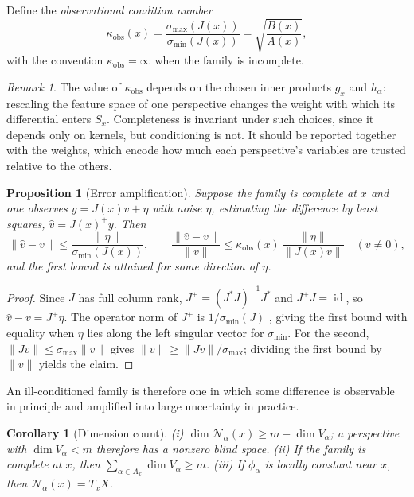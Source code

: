 \documentclass[11pt]{article}
\newtheorem{proposition}{Proposition}
\newtheorem{corollary}{Corollary}
\theoremstyle{remark}
\newtheorem{remark}{Remark}
\newcommand{\N}{\mathcal{N}}
\newcommand{\id}{\operatorname{id}}
\begin{document}
Define the \emph{observational condition number}
\[
\kappa_{\mathrm{obs}}(x)=\frac{\sigma_{\max}(J(x))}{\sigma_{\min}(J(x))}=\sqrt{\frac{B(x)}{A(x)}},
\]
with the convention $\kappa_{\mathrm{obs}}=\infty$ when the family is incomplete.

\begin{remark}
The value of $\kappa_{\mathrm{obs}}$ depends on the chosen inner products $g_x$ and $h_\alpha$: rescaling the feature space of one perspective changes the weight with which its differential enters $S_x$. Completeness is invariant under such choices, since it depends only on kernels, but conditioning is not. It should be reported together with the weights, which encode how much each perspective's variables are trusted relative to the others.
\end{remark}

\begin{proposition}[Error amplification]
Suppose the family is complete at $x$ and one observes $y=J(x)v+\eta$ with noise $\eta$, estimating the difference by least squares, $\hat v=J(x)^{+}y$. Then
\[
\|\hat v-v\|\le\frac{\|\eta\|}{\sigma_{\min}(J(x))},
\qquad
\frac{\|\hat v-v\|}{\|v\|}\le\kappa_{\mathrm{obs}}(x)\,\frac{\|\eta\|}{\|J(x)v\|}\quad(v\neq0),
\]
and the first bound is attained for some direction of $\eta$.
\end{proposition}

\begin{proof}
Since $J$ has full column rank, $J^{+}=(J^{*}J)^{-1}J^{*}$ and $J^{+}J=\id$, so $\hat v-v=J^{+}\eta$. The operator norm of $J^{+}$ is $1/\sigma_{\min}(J)$ \cite{golub}, giving the first bound with equality when $\eta$ lies along the left singular vector for $\sigma_{\min}$. For the second, $\|J v\|\le\sigma_{\max}\|v\|$ gives $\|v\|\ge\|Jv\|/\sigma_{\max}$; dividing the first bound by $\|v\|$ yields the claim.
\end{proof}

An ill-conditioned family is therefore one in which some difference is observable in principle and amplified into large uncertainty in practice.

\begin{corollary}[Dimension count]\label{cor:dim}
(i) $\dim\N_\alpha(x)\ge m-\dim V_\alpha$; a perspective with $\dim V_\alpha<m$ therefore has a nonzero blind space. (ii) If the family is complete at $x$, then $\sum_{\alpha\in A_x}\dim V_\alpha\ge m$. (iii) If $\phi_\alpha$ is locally constant near $x$, then $\N_\alpha(x)=T_xX$.
\end{corollary}
\end{document}
